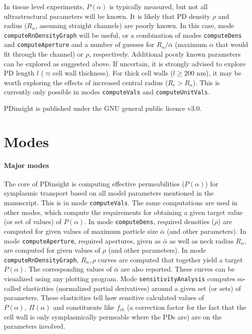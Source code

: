 \documentclass[a4paper,12pt]{article}
\newcommand{\SEL}{\bar{\alpha}}
\newcommand{\patchy}{f_{ih}}
\begin{document}
In tissue level experiments, $P(\alpha)$ is typically measured, but not all ultrastructural parameters will be known. It is likely that PD density $\rho$ and radius ($R_n$, assuming straight channels) are poorly known. In this case, mode \texttt{computeRnDensityGraph} will be useful, or a combination of modes \texttt{computeDens} and \texttt{computeAperture} and a number of guesses for $R_n$/$\SEL$ (maximum $\alpha$ that would fit through the channel) or $\rho$, respectively. Additional poorly known parameters can be explored as suggested above. If uncertain, it is strongly advised to explore PD length $l$ ($\approx$cell wall thickness). For thick cell walls ($l \ge 200$ nm), it may be worth exploring the effects of increased central radius ($R_c>R_n$). This is currently only possible in modes \texttt{computeVals} and \texttt{computeUnitVals}.

PDinsight is published under the GNU general public licence v3.0. 

\section{Modes}
\paragraph{Major modes} The core of PDinsight is computing effective permeabilities ($P(\alpha)$) for symplasmic transport based on all model parameters mentioned in the manuscript. This is in mode \texttt{computeVals}. The same computations are used in other modes, which compute the requirements for obtaining a given target value (or set of values) of $P(\alpha)$. In mode \texttt{computeDens}, required densities ($\rho$) are computed for given values of maximum particle size $\SEL$ (and other parameters). In mode \texttt{computeAperture}, required apertures, given as $\SEL$ as well as neck radius $R_n$, are computed for given values of $\rho$ (and other parameters). In mode \texttt{computeRnDensityGraph}, $R_n,\rho$ curves are computed that together yield a target $P(\alpha)$. The corresponding values of $\SEL$ are also reported. These curves can be visualized using any plotting program. Mode \texttt{sensitivityAnalysis} computes so-called elasticities (normalized partial derivatives) around a given set (or sets) of parameters. These elasticities tell how sensitive calculated values of $P(\alpha),\ \Pi(\alpha)$ and constituents like $\patchy$ (a correction factor for the fact that the cell wall is only symplasmically permeable where the PDs are) are on the parameters involved. 
\end{document}
